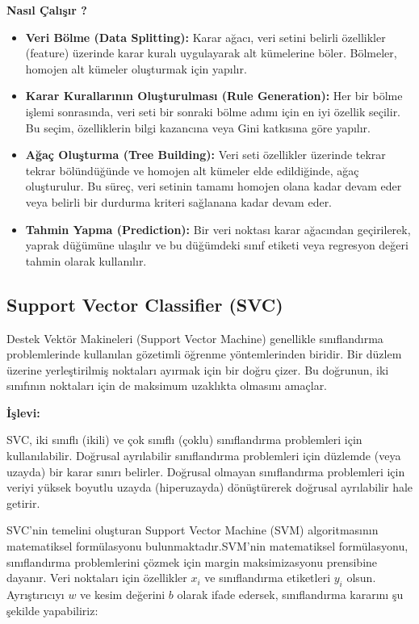 \documentclass[twocolumn]{article}
\begin{document}
	\textbf{Nasıl Çalışır ?}
	\begin{itemize}
		\item \textbf{Veri Bölme (Data Splitting):} Karar ağacı, veri setini belirli özellikler (feature) üzerinde karar kuralı uygulayarak alt kümelerine böler. Bölmeler, homojen alt kümeler oluşturmak için yapılır.
		\item \textbf{Karar Kurallarının Oluşturulması (Rule Generation):} Her bir bölme işlemi sonrasında, veri seti bir sonraki bölme adımı için en iyi özellik seçilir. Bu seçim, özelliklerin bilgi kazancına veya Gini katkısına göre yapılır.
		\item \textbf{Ağaç Oluşturma (Tree Building):} Veri seti özellikler üzerinde tekrar tekrar bölündüğünde ve homojen alt kümeler elde edildiğinde, ağaç oluşturulur. Bu süreç, veri setinin tamamı homojen olana kadar devam eder veya belirli bir durdurma kriteri sağlanana kadar devam eder.
		\item \textbf{Tahmin Yapma (Prediction):} Bir veri noktası karar ağacından geçirilerek, yaprak düğümüne ulaşılır ve bu düğümdeki sınıf etiketi veya regresyon değeri tahmin olarak kullanılır.
	\end{itemize}
	
	
	
	
	\subsection {Support Vector Classifier (SVC)}
	Destek Vektör Makineleri (Support Vector Machine) genellikle sınıflandırma problemlerinde kullanılan gözetimli öğrenme yöntemlerinden biridir. Bir düzlem üzerine yerleştirilmiş noktaları ayırmak için bir doğru çizer. Bu doğrunun, iki sınıfının noktaları için de maksimum uzaklıkta olmasını amaçlar.\cite{svm_medium}
	
	\textbf{İşlevi:}
	
	SVC, iki sınıflı (ikili) ve çok sınıflı (çoklu) sınıflandırma problemleri için kullanılabilir.
	Doğrusal ayrılabilir sınıflandırma problemleri için düzlemde (veya uzayda) bir karar sınırı belirler.
	Doğrusal olmayan sınıflandırma problemleri için veriyi yüksek boyutlu uzayda (hiperuzayda) dönüştürerek doğrusal ayrılabilir hale getirir.
	
	SVC'nin temelini oluşturan Support Vector Machine (SVM) algoritmasının matematiksel formülasyonu bulunmaktadır.SVM'nin matematiksel formülasyonu, sınıflandırma problemlerini çözmek için margin maksimizasyonu prensibine dayanır. Veri noktaları için özellikler $x_i$ ve sınıflandırma etiketleri $y_i$ olsun. Ayrıştırıcıyı $w$ ve kesim değerini $b$ olarak ifade edersek, sınıflandırma kararını şu şekilde yapabiliriz:
	
\end{document}
